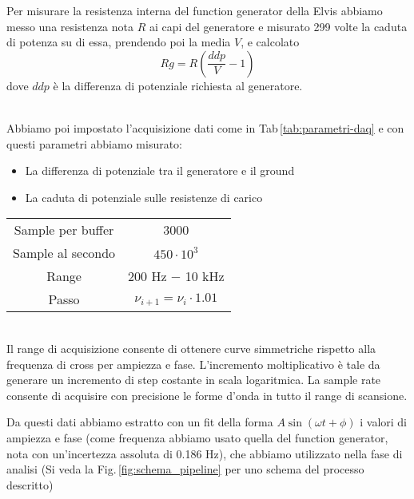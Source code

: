 \documentclass[../Relazione_circuiti]{subfiles}
\begin{document}
  Per misurare la resistenza interna del function generator della Elvis abbiamo messo una resistenza nota $R$ ai capi
  del generatore e misurato 299 volte la caduta di potenza su di essa, prendendo poi la media $V$, e calcolato
  \begin{equation*}
    Rg = R \left( \frac{ddp}{V} - 1 \right)
  \end{equation*}
  dove $ddp$ è la differenza di potenziale richiesta al generatore. \\ \\
  \begin{minipage}{0.49\textwidth}
    \setlength{\parindent}{20pt}
    Abbiamo poi impostato l'acquisizione dati come in Tab\,\ref{tab:parametri-daq} e con questi parametri abbiamo
    misurato:
    \begin{itemize}
      \item La differenza di potenziale tra il generatore e il ground
      \item La caduta di potenziale sulle resistenze di carico
    \end{itemize}

  \end{minipage} \hfill
  \begin{minipage}{0.49\textwidth}

    \centering
    \begin{minipage}{0.85\textwidth}
      \centering
      \begin{tabular}{|c|c|}
        \hline
        Sample per buffer & 3000                           \\
        Sample al secondo & $ 450 \cdot 10^3 $             \\
        Range             & 200 Hz − 10 kHz                \\
        Passo             & $\nu_{i+1} = \nu_i \cdot 1.01$ \\ \hline
      \end{tabular}

      \label{tab:parametri-daq}
    \end{minipage}

  \end{minipage} \\
  
  Il range di acquisizione consente di ottenere curve simmetriche rispetto alla frequenza di cross per ampiezza e fase. L'incremento moltiplicativo è tale da generare un incremento  di step costante in scala logaritmica. La sample rate consente di acquisire con precisione le forme d'onda in tutto il range di scansione.

  Da questi dati abbiamo estratto con un fit della forma $ A \sin\left( \omega t + \phi \right) $ i valori di ampiezza e
  fase (come frequenza abbiamo usato quella del function generator, nota con un'incertezza assoluta di 0.186 Hz), che
  abbiamo utilizzato nella fase di analisi (Si veda la Fig.\,\ref{fig:schema_pipeline} per uno schema del processo
  descritto)
\end{document}
